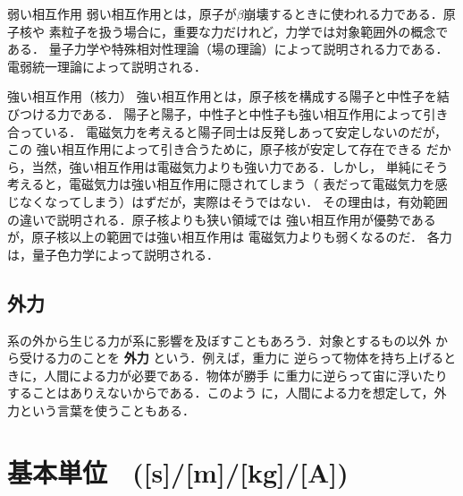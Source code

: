             \begin{mysmallsec}{弱い相互作用}
            弱い相互作用とは，原子が$\beta$崩壊するときに使われる力である．原子核や
            素粒子を扱う場合に，重要な力だけれど，力学では対象範囲外の概念である．
            量子力学や特殊相対性理論（場の理論）によって説明される力である．
                        電弱統一理論によって説明される．
            \end{mysmallsec}

            \begin{mysmallsec}{強い相互作用（核力）}
            強い相互作用とは，原子核を構成する陽子と中性子を結びつける力である．
            陽子と陽子，中性子と中性子も強い相互作用によって引き合っている．
            電磁気力を考えると陽子同士は反発しあって安定しないのだが，この
            強い相互作用によって引き合うために，原子核が安定して存在できる
            だから，当然，強い相互作用は電磁気力よりも強い力である．しかし，
            単純にそう考えると，電磁気力は強い相互作用に隠されてしまう（
            表だって電磁気力を感じなくなってしまう）はずだが，実際はそうではない．
            その理由は，有効範囲の違いで説明される．原子核よりも狭い領域では
            強い相互作用が優勢であるが，原子核以上の範囲では強い相互作用は
            電磁気力よりも弱くなるのだ．
                        各力は，量子色力学によって説明される．
            \end{mysmallsec}

        \subsection{外力}
            系の外から生じる力が系に影響を及ぼすこともあろう．対象とするもの以外
            から受ける力のことを \textbf{外力} という．例えば，重力に
            逆らって物体を持ち上げるときに，人間による力が必要である．物体が勝手
            に重力に逆らって宙に浮いたりすることはありえないからである．このよう
            に，人間による力を想定して，外力という言葉を使うこともある．

    \section{基本単位　([s]/[m]/[kg]/[A])}
